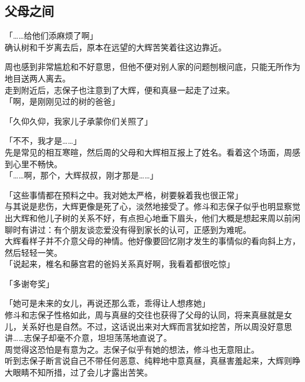 \subsection{父母之间}

「……给他们添麻烦了啊」\\

确认树和千岁离去后，原本在远望的大辉苦笑着往这边靠近。

周也感到非常尴尬和不好意思，但他不便对别人家的问题刨根问底，只能无所作为地目送两人离去。\\

走到附近后，志保子也注意到了大辉，便和真昼一起走了过来。\\

「啊，是刚刚见过的树的爸爸」

「久仰久仰，我家儿子承蒙你们关照了」

「不不，我才是……」\\

先是常见的相互寒暄，然后周的父母和大辉相互报上了姓名。看着这个场面，周感到心里不畅快。\\

「……啊，那个，大辉叔叔，刚才那是……」

「这些事情都在预料之中。我对她太严格，树要躲着我也很正常」\\

与其说是悲伤，大辉更像是死了心，淡然地接受了。修斗和志保子似乎也明显察觉出大辉和他儿子树的关系不好，有点担心地垂下眉头，他们大概是想起来周以前闲聊时有讲过：有个朋友谈恋爱没有得到家长的认可，正感到为难呢。\\

大辉看样子并不介意父母的神情。他好像要回忆刚才发生的事情似的看向斜上方，然后轻轻一笑。\\

「说起来，椎名和藤宫君的爸妈关系真好啊，我看着都很吃惊」

「多谢夸奖」

「她可是未来的女儿，再说还那么乖，乖得让人想疼她」\\

修斗和志保子性格如此，周与真昼的交往也获得了父母的认同，将来真昼就是女儿，关系好也是自然。不过，这话说出来对大辉而言犹如挖苦，所以周没好意思讲……志保子却毫不介意，坦坦荡荡地直说了。\\

周觉得这恐怕是有意为之。志保子似乎有她的想法，修斗也无意阻止。\\

听到志保子断言说自己不带任何恶意、纯粹地中意真昼，真昼害羞起来，大辉则睁大眼睛不知所措，过了会儿才露出苦笑。\\

